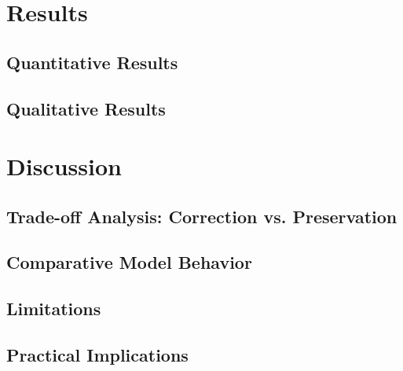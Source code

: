 \documentclass[11pt]{extarticle}
\begin{document}
\section{Results}

\subsection{Quantitative Results}

\subsection{Qualitative Results}


\section{Discussion}

\subsection{Trade-off Analysis: Correction vs. Preservation}

\subsection{Comparative Model Behavior}

\subsection{Limitations}

\subsection{Practical Implications}


\end{document}
